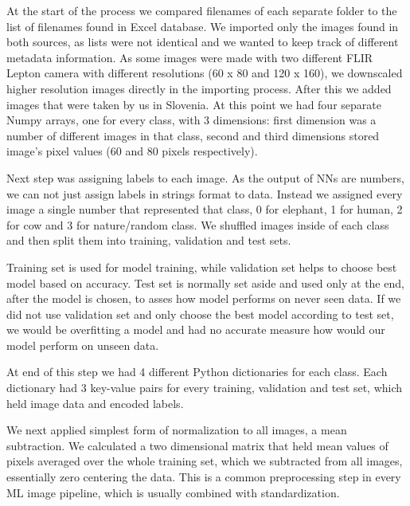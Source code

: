 At the start of the process we compared filenames of each separate folder to the list of filenames found in Excel database.
We imported only the images found in both sources, as lists were not identical and we wanted to keep track of different metadata information.
As some images were made with two different FLIR Lepton camera with different resolutions (60 x 80 and 120 x 160), we downscaled higher resolution images directly in the importing process.
After this we added images that were taken by us in Slovenia.
At this point we had four separate Numpy arrays, one for every class, with 3 dimensions: first dimension was a number of different images in that class, second and third dimensions stored image's pixel values (60 and 80 pixels respectively).

Next step was assigning labels to each image.
As the output of NNs are numbers, we can not just assign labels in strings format to data.
Instead we assigned every image a single number that represented that class, 0 for elephant, 1 for human, 2 for cow and 3 for nature/random class.
We shuffled images inside of each class and then split them into training, validation and test sets.

Training set is used for model training, while validation set helps to choose best model based on accuracy.
Test set is normally set aside and used only at the end, after the model is chosen, to asses how model performs on never seen data.
If we did not use validation set and only choose the best model according to test set, we would be overfitting a model and had no accurate measure how would our model perform on unseen data.

At end of this step we had 4 different Python dictionaries for each class.
Each dictionary had 3 key-value pairs for every training, validation and test set, which held image data and encoded labels.

We next applied simplest form of normalization to all images, a mean subtraction.
We calculated a two dimensional matrix that held mean values of pixels averaged over the whole training set, which we subtracted from all images, essentially zero centering the data.
This is a common preprocessing step in every ML image pipeline, which is usually combined with standardization\footnotemark.


